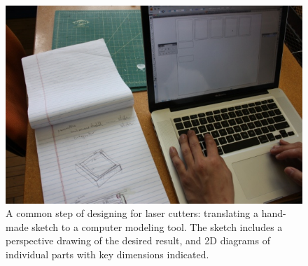 \begin{figure}[t]
  \centering
  \includegraphics[width=0.7\linewidth]{img/translate-sketch-to-computer.jpg}
  \caption[Translating Paper Sketch to Computer Model]{A common step
    of designing for laser cutters: translating a hand-made sketch to
    a computer modeling tool. The sketch includes a perspective
    drawing of the desired result, and 2D diagrams of individual parts
    with key dimensions indicated.}
  \label{fig:translate}
\end{figure}

